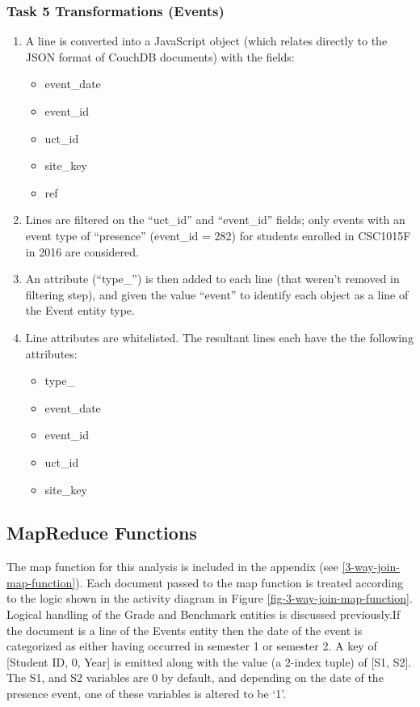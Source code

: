 \subsubsection{Task 5 Transformations (Events)}
\begin{enumerate}
    \item A line is converted into a JavaScript object (which relates directly to the JSON format of CouchDB documents) with the fields:
          \begin{itemize}
              \item event\_date
              \item event\_id
              \item uct\_id
              \item site\_key
              \item ref
          \end{itemize}
    \item Lines are filtered on the ``uct\_id'' and ``event\_id'' fields; only events with an event type of ``presence'' (event\_id = 282) for students enrolled in CSC1015F in 2016 are considered.
    \item An attribute (``type\_'') is then added to each line (that weren't removed in filtering step), and given the value ``event'' to identify each object as a line of the Event entity type.
    \item Line attributes are whitelisted. The resultant lines each have the the following attributes:
          \begin{itemize}
              \item type\_
              \item event\_date
              \item event\_id
              \item uct\_id
              \item site\_key
          \end{itemize}
\end{enumerate}

\subsection{MapReduce Functions}
The map function for this analysis is included in the appendix (see \ref{3-way-join-map-function}). Each document passed to the map function is treated according to the logic shown in the activity diagram in Figure \ref{fig-3-way-join-map-function}. Logical handling of the Grade and Benchmark entities is discussed previously.If the document is a line of the Events entity then the date of the event is categorized as either having occurred in semester 1 or semester 2. A key of [Student ID, 0, Year] is emitted along with the value (a 2-index tuple) of [S1, S2]. The S1, and S2 variables are 0 by default, and depending on the date of the presence event, one of these variables is altered to be `1'.

